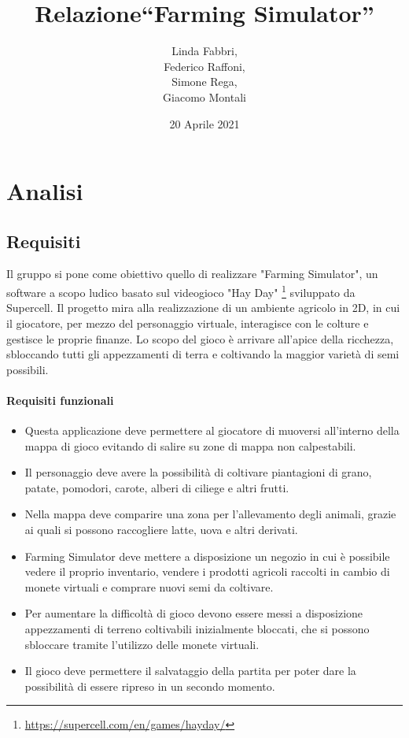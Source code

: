 \documentclass[a4paper,12pt]{report}
\title{Relazione\break``Farming Simulator''}
\author{Linda Fabbri, \\ Federico Raffoni,\\ Simone Rega,\\ Giacomo Montali}
\date{20 Aprile 2021}
\begin{document}
\maketitle

\tableofcontents

\chapter{Analisi}


\section{Requisiti}


Il gruppo si pone come obiettivo quello di realizzare "Farming Simulator", un software a scopo ludico basato sul videogioco "Hay Day" \footnote{\url{https://supercell.com/en/games/hayday/}} sviluppato da Supercell.
%
Il progetto mira alla realizzazione di un ambiente agricolo in 2D, in cui il giocatore, per mezzo del personaggio virtuale, interagisce con le colture e gestisce le proprie finanze.
%
Lo scopo del gioco è arrivare all'apice della ricchezza, sbloccando tutti gli appezzamenti di terra e coltivando la maggior varietà di semi possibili.


\subsubsection{Requisiti funzionali}
\begin{itemize}
	\item Questa applicazione deve permettere al giocatore di muoversi all'interno della mappa di gioco evitando di salire su zone di mappa non calpestabili.
	\item Il personaggio deve avere la possibilità di coltivare piantagioni di grano, patate, pomodori, carote, alberi di ciliege e altri frutti.
	\item Nella mappa deve comparire una zona per l'allevamento degli animali, grazie ai quali si possono raccogliere latte, uova e altri derivati.
	\item Farming Simulator deve mettere a disposizione un negozio in cui è possibile vedere il proprio inventario, vendere i prodotti agricoli raccolti in cambio di monete virtuali e comprare nuovi semi da coltivare.
	\item Per aumentare la difficoltà di gioco devono essere messi a disposizione appezzamenti di terreno coltivabili inizialmente bloccati, che si possono sbloccare tramite l'utilizzo delle monete virtuali.
	\item Il gioco deve permettere il salvataggio della partita per poter dare la possibilità di essere ripreso in un secondo momento.
\end{itemize}
\end{document}
